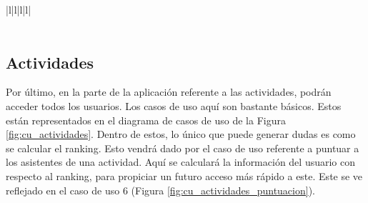 \begin{table}[hp!]
{\begin{tabular}{|l|l|l|l|}
        \hline
                                                                                                                                                                                                                                \\ 
        \hline
                                                                                                                                                \\
        \hline
        \end{tabular}
    }
    \caption{Curso de eventos del caso de uso 5}
\end{table}

\newpage

\subsection{Actividades}

Por último, en la parte de la aplicación referente a las actividades, podrán acceder todos los usuarios. Los casos de uso aquí son bastante básicos. Estos están representados en el diagrama de casos de uso de la Figura \ref{fig:cu_actividades}. Dentro de estos, lo único que puede generar dudas es como se calcular el ranking. Esto vendrá dado por el caso de uso referente a puntuar a los asistentes de una actividad. Aquí se calculará la información del usuario con respecto al ranking, para propiciar un futuro acceso más rápido a este. Este se ve reflejado en el caso de uso 6 (Figura \ref{fig:cu_actividades_puntuacion}).

